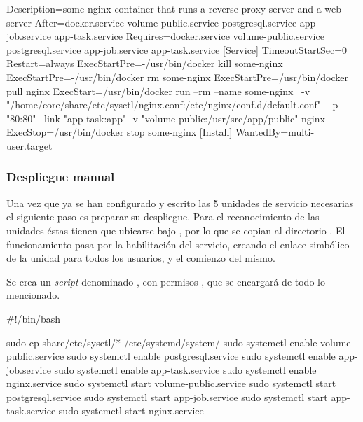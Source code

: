 \begin{codelisting}
\label{code:nginx.service}
\begin{code}
[Unit] 
  Description=some-nginx container that runs a reverse proxy server and a 
              web server
  After=docker.service volume-public.service postgresql.service app-job.service 
        app-task.service
  Requires=docker.service volume-public.service postgresql.service 
           app-job.service app-task.service
[Service] 
  TimeoutStartSec=0
  Restart=always 
  ExecStartPre=-/usr/bin/docker kill some-nginx 
  ExecStartPre=-/usr/bin/docker rm some-nginx
  ExecStartPre=/usr/bin/docker pull nginx 
  ExecStart=/usr/bin/docker run --rm --name some-nginx \
  -v "/home/core/share/etc/sysctl/nginx.conf:/etc/nginx/conf.d/default.conf" \
  -p "80:80" --link "app-task:app" -v "volume-public:/usr/src/app/public" nginx 
  ExecStop=/usr/bin/docker stop some-nginx
[Install] 
  WantedBy=multi-user.target
\end{code}
\end{codelisting}

\subsubsection{Despliegue manual}

Una vez que ya se han configurado y escrito las 5 unidades de servicio necesarias el siguiente paso es preparar su despliegue. Para el reconocimiento de las unidades éstas tienen que ubicarse bajo , por lo que se copian al directorio . El funcionamiento pasa por la habilitación del servicio, creando el enlace simbólico de la unidad para todos los usuarios, y el comienzo del mismo.

Se crea un \textit{script} denominado \kode{coreos-service-units-deploy.sh}, con permisos \kode{chmod +x}, que se encargará de todo lo mencionado.

\begin{codelisting}
\label{code:coreos-service-units-deploy}
\begin{code}
#!/bin/bash

sudo cp share/etc/sysctl/* /etc/systemd/system/
sudo systemctl enable volume-public.service
sudo systemctl enable postgresql.service
sudo systemctl enable app-job.service
sudo systemctl enable app-task.service
sudo systemctl enable nginx.service
sudo systemctl start volume-public.service
sudo systemctl start postgresql.service
sudo systemctl start app-job.service
sudo systemctl start app-task.service
sudo systemctl start nginx.service
\end{code}
\end{codelisting}

